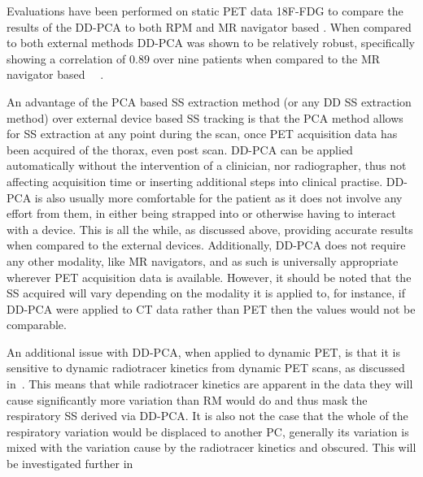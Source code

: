                 Evaluations have been performed on static PET data \gls{18F-FDG} to compare the results of the \gls{DD-PCA} to both \gls{RPM} and \gls{MR} navigator based . When compared to both external methods \gls{DD-PCA} was shown to be relatively robust, specifically showing a correlation of $0.89$ over nine patients when compared to the \gls{MR} navigator based ~~.
                
                An advantage of the \gls{PCA} based \gls{SS} extraction method (or any \gls{DD} \gls{SS} extraction method) over external device based \gls{SS} tracking is that the \gls{PCA} method allows for \gls{SS} extraction at any point during the scan, once \gls{PET} acquisition data has been acquired of the thorax, even post scan. \gls{DD-PCA} can be applied automatically without the intervention of a clinician, nor radiographer, thus not affecting acquisition time or inserting additional steps into clinical practise. \gls{DD-PCA} is also usually more comfortable for the patient as it does not involve any effort from them, in either being strapped into or otherwise having to interact with a device. This is all the while, as discussed above, providing accurate results when compared to the external devices. Additionally, \gls{DD-PCA} does not require any other modality, like \gls{MR} navigators, and as such is universally appropriate wherever \gls{PET} acquisition data is available. However, it should be noted that the \gls{SS} acquired will vary depending on the modality it is applied to, for instance, if \gls{DD-PCA} were applied to \gls{CT} data rather than \gls{PET} then the values would not be comparable.
                
                An additional issue with \gls{DD-PCA}, when applied to dynamic \gls{PET}, is that it is sensitive to dynamic radiotracer kinetics from dynamic \gls{PET} scans, as discussed in~. This means that while radiotracer kinetics are apparent in the data they will cause significantly more variation than \gls{RM} would do and thus mask the respiratory \gls{SS} derived via \gls{DD-PCA}. It is also not the case that the whole of the respiratory variation would be displaced to another \gls{PC}, generally its variation is mixed with the variation cause by the radiotracer kinetics and obscured. This will be investigated further in~
        
